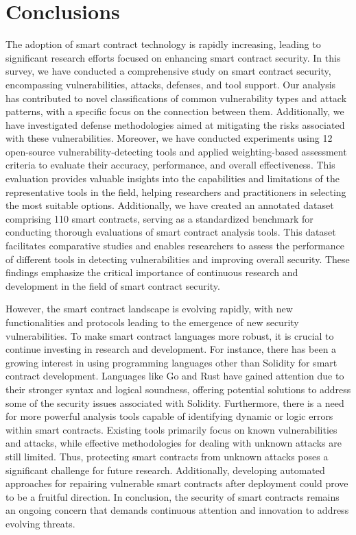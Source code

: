 \documentclass[manuscript,screen]{acmart}
\begin{document}
\section{Conclusions}
\label{discussion}

The adoption of smart contract technology is rapidly increasing, leading to significant research efforts focused on enhancing smart contract security. In this survey, we have conducted a comprehensive study on smart contract security, encompassing vulnerabilities, attacks, defenses, and tool support. Our analysis has contributed to novel classifications of common vulnerability types and attack patterns, with a specific focus on the connection between them. Additionally, we have investigated defense methodologies aimed at mitigating the risks associated with these vulnerabilities. 
Moreover, we have conducted experiments using 12 open-source vulnerability-detecting tools and applied weighting-based assessment criteria to evaluate their accuracy, performance, and overall effectiveness. This evaluation provides valuable insights into the capabilities and limitations of the representative tools in the field, helping researchers and practitioners in selecting the most suitable options. 
Additionally, we have created an annotated dataset comprising 110 smart contracts, serving as a standardized benchmark for conducting thorough evaluations of smart contract analysis tools. This dataset facilitates comparative studies and enables researchers to assess the performance of different tools in detecting vulnerabilities and improving overall security. 
These findings emphasize the critical importance of continuous research and development in the field of smart contract security.

However, the smart contract landscape is evolving rapidly, with new functionalities and protocols leading to the emergence of new security vulnerabilities. To make smart contract languages more robust, it is crucial to continue investing in research and development. For instance, there has been a growing interest in using programming languages other than Solidity for smart contract development. Languages like Go and Rust have gained attention due to their stronger syntax and logical soundness, offering potential solutions to address some of the security issues associated with Solidity. 
Furthermore, there is a need for more powerful analysis tools capable of identifying dynamic or logic errors within smart contracts. Existing tools primarily focus on known vulnerabilities and attacks, while effective methodologies for dealing with unknown attacks are still limited. Thus, protecting smart contracts from unknown attacks poses a significant challenge for future research. Additionally, developing automated approaches for repairing vulnerable smart contracts after deployment could prove to be a fruitful direction. 
In conclusion, the security of smart contracts remains an ongoing concern that demands continuous attention and innovation to address evolving threats.
\end{document}
